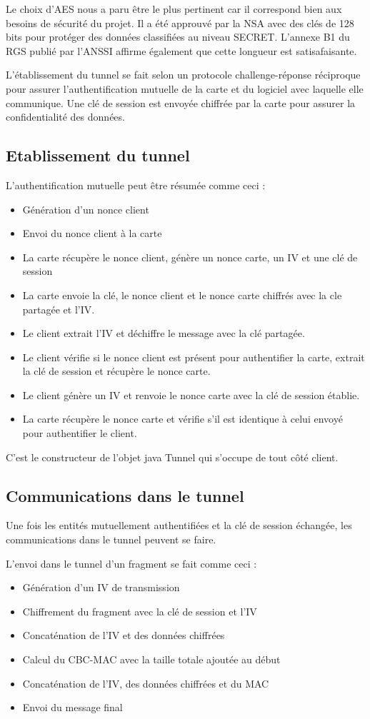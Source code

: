 \documentclass[a4paper,11pt,french]{article}
\begin{document}
Le choix d'AES nous a paru être le plus pertinent car il correspond bien aux besoins de sécurité du projet. Il a été approuvé par la NSA avec des clés de 128 bits pour protéger des données classifiées au niveau SECRET. L'annexe B1 du RGS publié par l'ANSSI affirme également que cette longueur est satisafaisante. 

  
L'établissement du tunnel se fait selon un protocole challenge-réponse réciproque pour assurer l'authentification mutuelle de la carte et du logiciel avec laquelle elle communique. Une clé de session est envoyée chiffrée par la carte pour assurer la confidentialité des données.

\subsection{Etablissement du tunnel}
L'authentification mutuelle peut être résumée comme ceci : 
\begin{itemize}
\item Génération d'un nonce client
\item Envoi du nonce client à la carte
\item La carte récupère le nonce client, génère un nonce carte, un IV et une clé de session
\item La carte envoie la clé, le nonce client et le nonce carte chiffrés avec la cle partagée et l'IV.
\item Le client extrait l'IV et déchiffre le message avec la clé partagée.
\item Le client vérifie si le nonce client est présent pour authentifier la carte, extrait la clé de session et récupère le nonce carte.
\item Le client génère un IV et renvoie le nonce carte avec la clé de session établie.
\item La carte récupère le nonce carte et vérifie s'il est identique à celui envoyé pour authentifier le client.
\end{itemize}

C'est le constructeur de l'objet java Tunnel qui s'occupe de tout côté client. 

\subsection{Communications dans le tunnel}
Une fois les entités mutuellement authentifiées et la clé de session échangée, les communications dans le tunnel peuvent se faire. 

L'envoi dans le tunnel d'un fragment se fait comme ceci : 
\begin{itemize}
\item Génération d'un IV de transmission
\item Chiffrement du fragment avec la clé de session et l'IV
\item Concaténation de l'IV et des données chiffrées
\item Calcul du CBC-MAC avec la taille totale ajoutée au début
\item Concaténation de l'IV, des données chiffrées et du MAC
\item Envoi du message final
\end{itemize} 


 
\end{document}
